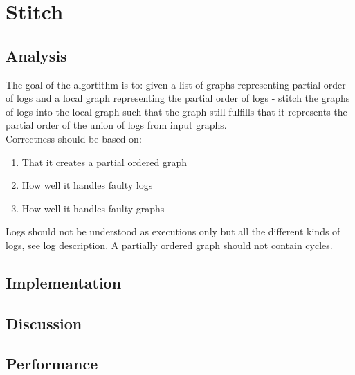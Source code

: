 \section{Stitch}
\subsection{Analysis} %
The goal of the algortithm is to: given a list of graphs representing partial order of logs and a local graph representing the partial order of logs - stitch the graphs of logs into the local graph such that the graph still fulfills that it represents the partial order of the union of logs from input graphs.\\

Correctness should be based on:
\begin{enumerate}
    \item That it creates a partial ordered graph
    \item How well it handles faulty logs
    \item How well it handles faulty graphs
\end{enumerate}

Logs should not be understood as executions only but all the different kinds of logs, see log description.
A partially ordered graph should not contain cycles.

\subsection{Implementation} %
\subsection{Discussion} %
\subsection{Performance} %


